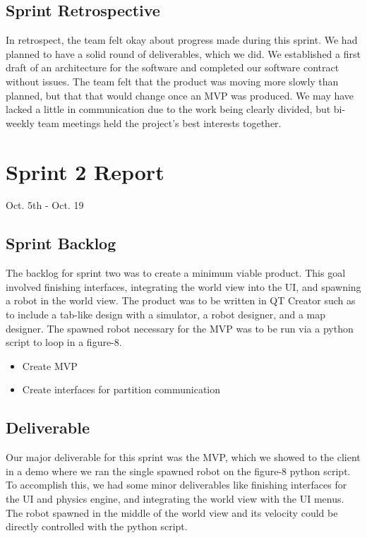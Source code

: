 \subsection{Sprint Retrospective}

In retrospect, the team felt okay about progress made during this sprint. We had planned to have a solid round of deliverables, which we did. We established a first draft of an architecture for the software and completed our software contract without issues. The team felt that the product was moving more slowly than planned, but that that would change once an MVP was produced. We may have lacked a little in communication due to the work being clearly divided, but bi-weekly team meetings held the project's best interests together.


\section{Sprint 2 Report}
Oct. 5th - Oct. 19
\subsection{Sprint Backlog}

The backlog for sprint two was to create a minimum viable product. This goal involved finishing interfaces, integrating the world view into the UI, and spawning a robot in the world view. The product was to be written in QT Creator such as to include a tab-like design with a simulator, a robot designer, and a map designer. The spawned robot necessary for the MVP was to be run via a python script to loop in a figure-8.

\begin{itemize}
	\item Create MVP
	\item Create interfaces for partition communication
\end{itemize}

\subsection{Deliverable}

Our major deliverable for this sprint was the MVP, which we showed to the client in a demo where we ran the single spawned robot on the figure-8 python script. To accomplish this, we had some minor deliverables like finishing interfaces for the UI and physics engine, and integrating the world view with the UI menus. The robot spawned in the middle of the world view and its velocity could be directly controlled with the python script.

